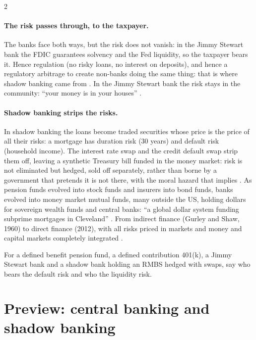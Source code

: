 \begin{paracol}{2}
\paragraph{The risk passes through, to the taxpayer.} The banks face both ways, but the risk does not vanish: in the Jimmy Stewart bank the FDIC guarantees
solvency and the Fed liquidity, so the taxpayer bears it. Hence regulation (no risky loans, no interest on deposits), and hence a regulatory arbitrage to create
non-banks doing the same thing: that is where shadow banking came from . In
the Jimmy Stewart bank the risk stays in the community: ``your money is in your houses'' .

\paragraph{Shadow banking strips the risks.} In shadow banking the loans become traded securities whose price is the price of all their risks: a mortgage has
duration risk (30 years) and default risk (household income). The interest rate swap and the credit default swap strip them off, leaving a synthetic Treasury
bill funded in the money market: risk is not eliminated but hedged, sold off separately, rather than borne by a government that pretends it is not there, with the
moral hazard that implies . As pension funds evolved into stock funds and insurers into bond funds,
banks evolved into money market mutual funds, many outside the US, holding dollars for sovereign wealth funds and central banks: ``a global dollar system funding
subprime mortgages in Cleveland'' . From indirect finance (Gurley and Shaw, 1960) to direct finance (2012),
with all risks priced in markets and money and capital markets completely integrated .

\begin{exercise}
For a defined benefit pension fund, a defined contribution 401(k), a Jimmy Stewart bank and a shadow bank holding an RMBS hedged with swaps, say who bears the
default risk and who the liquidity risk.
\end{exercise}

\section{Preview: central banking and shadow banking}\label{sec:di-preview}


\end{paracol}
